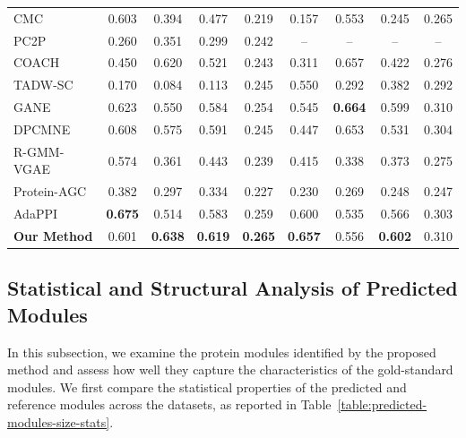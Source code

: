 \begin{table}[t]
\begin{tabular*}{0.8\textwidth}{@{\extracolsep{\fill}}l cccc cccc@{}}
		CMC
		& 0.603 & 0.394 & 0.477 & 0.219
		& 0.157 & 0.553 & 0.245 & 0.265 \\
		
		PC2P
		& 0.260 & 0.351 & 0.299 & 0.242
		& -- & -- & -- & -- \\
		
		COACH
		& 0.450 & 0.620 & 0.521 & 0.243
		& 0.311 & 0.657 & 0.422 & 0.276 \\
		
		TADW-SC
		& 0.170 & 0.084 & 0.113 & 0.245
		& 0.550 & 0.292 & 0.382 & 0.292 \\
		
		GANE
		& 0.623 & 0.550 & 0.584 & 0.254
		& 0.545 & \textbf{0.664} & 0.599 & 0.310 \\
		
		DPCMNE
		& 0.608 & 0.575 & 0.591 & 0.245
		& 0.447 & 0.653 & 0.531 & 0.304 \\
		
		R-GMM-VGAE
		& 0.574 & 0.361 & 0.443 & 0.239
		& 0.415 & 0.338 & 0.373 & 0.275 \\
		
		Protein-AGC
		& 0.382 & 0.297 & 0.334 & 0.227
		& 0.230 & 0.269 & 0.248 & 0.247 \\
		
		AdaPPI
		& \textbf{0.675} & 0.514 & 0.583 & 0.259
		& 0.600 & 0.535 & 0.566 & 0.303 \\
		
		\hline
		\textbf{Our Method}
		& 0.601 & \textbf{0.638} & \textbf{0.619} & \textbf{0.265}
		& \textbf{0.657} & 0.556 & \textbf{0.602} & 0.310 \\
		\hline
	\end{tabular*}
	
\end{table}

\subsection{Statistical and Structural Analysis of Predicted Modules}


In this subsection, we examine the protein modules identified by the proposed method and assess how well they capture the characteristics of the gold-standard modules. We first compare the statistical properties of the predicted and reference modules across the datasets, as reported in Table~\ref{table:predicted-modules-size-stats}.

